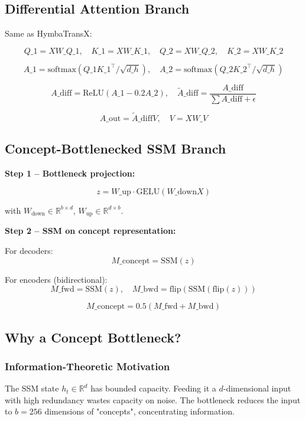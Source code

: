 \subsection{Differential Attention Branch}

Same as HymbaTransX:

\[
Q\_1 = X W\_{Q\_1}, \quad K\_1 = X W\_{K\_1}, \quad
Q\_2 = X W\_{Q\_2}, \quad K\_2 = X W\_{K\_2}
\tag{4.1}
\]

\[
A\_1 = \text{softmax}(Q\_1 K\_1^\top / \sqrt{d\_h}), \quad
A\_2 = \text{softmax}(Q\_2 K\_2^\top / \sqrt{d\_h})
\tag{4.2}
\]

\[
A\_\text{diff} = \text{ReLU}(A\_1 - 0.2 A\_2), \quad
\tilde{A}\_\text{diff} = \frac{A\_\text{diff}}{\sum A\_\text{diff} + \epsilon}
\tag{4.3}
\]

\[
A\_\text{out} = \tilde{A}\_\text{diff} V, \quad V = X W\_V
\tag{4.4}
\]

\subsection{Concept-Bottlenecked SSM Branch}

\textbf{Step 1 -- Bottleneck projection:}

\[
z = W\_\text{up} \cdot \text{GELU}(W\_\text{down} X)
\tag{4.5}
\]

with $W_\text{down} \in \mathbb{R}^{b \times d}$, $W_\text{up} \in \mathbb{R}^{d \times b}$.

\textbf{Step 2 -- SSM on concept representation:}

For decoders:
\[
M\_\text{concept} = \text{SSM}(z)
\tag{4.6}
\]

For encoders (bidirectional):
\[
M\_\text{fwd} = \text{SSM}(z), \quad M\_\text{bwd} = \text{flip}(\text{SSM}(\text{flip}(z)))
\tag{4.7}
\]

\[
M\_\text{concept} = 0.5(M\_\text{fwd} + M\_\text{bwd})
\tag{4.8}
\]

\subsection{Why a Concept Bottleneck?}

\subsubsection{Information-Theoretic Motivation}

The SSM state $h_t \in \mathbb{R}^d$ has bounded capacity. Feeding it a 
$d$-dimensional input with high redundancy wastes capacity on noise. The 
bottleneck reduces the input to $b = 256$ dimensions of "concepts", 
concentrating information.

